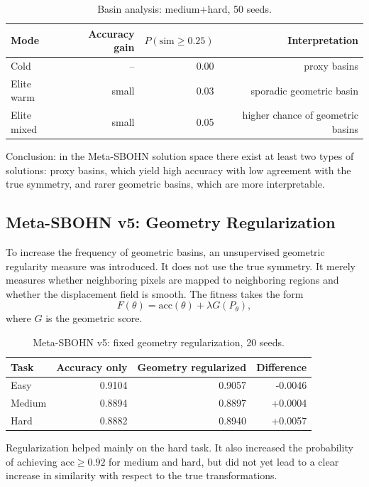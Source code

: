 \documentclass[11pt,a4paper]{report}
\begin{document}
\begin{table}[h]
\centering
\caption{Basin analysis: medium+hard, 50 seeds.}
\begin{tabular}{l r r r}
\hline
Mode & Accuracy gain & \(P(\mathrm{sim}\ge 0.25)\) & Interpretation \\
\hline
Cold & -- & 0.00 & proxy basins \\
Elite warm & small & 0.03 & sporadic geometric basin \\
Elite mixed & small & 0.05 & higher chance of geometric basins \\
\hline
\end{tabular}
\end{table}

Conclusion: in the Meta-SBOHN solution space there exist at least two types of solutions: proxy basins,
which yield high accuracy with low agreement with the true symmetry, and rarer
geometric basins, which are more interpretable.

\subsection{Meta-SBOHN v5: Geometry Regularization}

To increase the frequency of geometric basins, an unsupervised geometric regularity
measure was introduced. It does not use the true symmetry. It merely measures whether
neighboring pixels are mapped to neighboring regions and whether the displacement field
is smooth. The fitness takes the form
\[
  F(\theta)=\mathrm{acc}(\theta)+\lambda G(P_\theta),
\]
where \(G\) is the geometric score.

\begin{table}[h]
\centering
\caption{Meta-SBOHN v5: fixed geometry regularization, 20 seeds.}
\begin{tabular}{l r r r}
\hline
Task & Accuracy only & Geometry regularized & Difference \\
\hline
Easy & 0.9104 & 0.9057 & -0.0046 \\
Medium & 0.8894 & 0.8897 & +0.0004 \\
Hard & 0.8882 & 0.8940 & +0.0057 \\
\hline
\end{tabular}
\end{table}

Regularization helped mainly on the hard task. It also increased the probability
of achieving \(\mathrm{acc}\ge 0.92\) for medium and hard, but did not yet lead to
a clear increase in similarity with respect to the true transformations.
\end{document}
